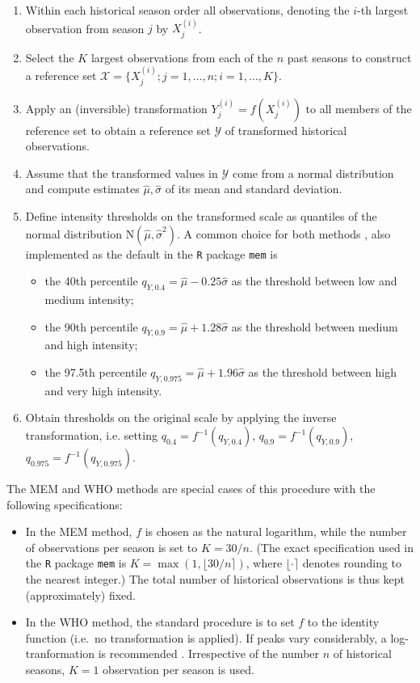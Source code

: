 \documentclass{article}
\begin{document}
\begin{enumerate}
\item Within each historical season order all observations, denoting the $i$-th largest observation from season $j$ by $X^{(i)}_j$.
\item Select the $K$ largest observations from each of the $n$ past seasons to construct a reference set $\mathcal{X} = \{X_j^{(i)}; j = 1, \dots, n; i = 1, \dots, K\}$.
\item Apply an (inversible) transformation $Y_j^{(i)} = f(X_j^{(i)})$ to all members of the reference set to obtain a reference set $\mathcal{Y}$ of transformed historical observations.
\item Assume that the transformed values in $\mathcal{Y}$ come from a normal distribution and compute estimates $\hat\mu, \hat \sigma$ of its mean and standard deviation.
\item Define intensity thresholds on the transformed scale as quantiles of the normal distribution N$(\hat\mu, \hat\sigma^2)$. A common choice for both methods \citep{WHO2017}, also implemented as the default in the \texttt{R} package \texttt{mem} \citep{Lozano2020} is
\begin{itemize}
\item the 40th percentile $q_{Y, 0.4} = \hat\mu - 0.25 \hat\sigma$ as the threshold between low and medium intensity;
\item the 90th percentile $q_{Y, 0.9} = \hat\mu + 1.28 \hat\sigma$ as the threshold between medium and high intensity;
\item the 97.5th percentile $q_{Y, 0.975} = \hat\mu + 1.96\hat\sigma$ as the threshold between high and very high intensity.
\end{itemize}
\item Obtain thresholds on the original scale by applying the inverse transformation, i.e. setting $q_{0.4} = f^{-1}(q_{Y, 0.4})$, $q_{0.9} = f^{-1}(q_{Y, 0.9})$, $q_{0.975} = f^{-1}(q_{Y, 0.975})$.
\end{enumerate}

\noindent The MEM and WHO methods are special cases of this procedure with the following specifications:
\begin{itemize}
\item In the MEM method, $f$ is chosen as the natural logarithm, while the number of observations per season is set to $K = 30/n$. (The exact specification used in the \texttt{R} package \texttt{mem} is $K = \max(1, \lfloor 30/n \rceil)$, where $\lfloor \cdot \rceil$ denotes rounding to the nearest integer.) The total number of historical observations is thus kept (approximately) fixed.
\item In the WHO method, the standard procedure is to set $f$ to the identity function (i.e.\ no transformation is applied). If peaks vary considerably, a log-tranformation is recommended \citep{WHO2017}. Irrespective of the number $n$ of historical seasons, $K = 1$ observation per season is used.
\end{itemize} 
\end{document}

